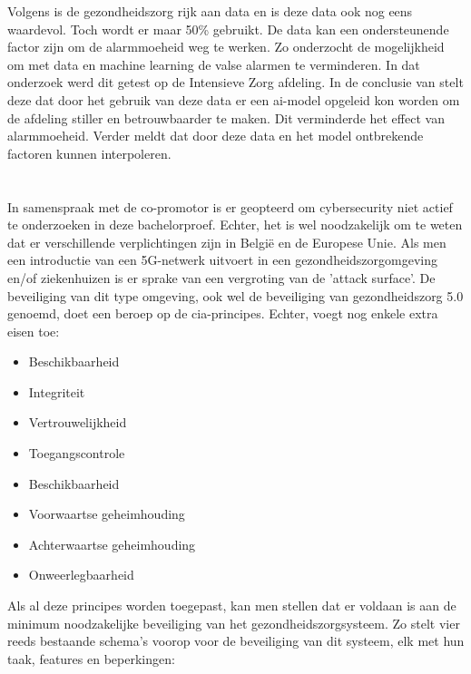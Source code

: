 Volgens \textcite{Niekerk2020} is de gezondheidszorg rijk aan data en is deze data ook nog eens waardevol. Toch wordt er maar 50\% gebruikt.
De data kan een ondersteunende factor zijn om de alarmmoeheid weg te werken. Zo onderzocht \textcite{Hever2019} de mogelijkheid om met data en machine learning de valse alarmen te verminderen. In dat onderzoek werd dit getest op de Intensieve Zorg afdeling. In de conclusie van \textcite{Hever2019} stelt deze dat door het gebruik van deze data er een \gls{ai}-model opgeleid kon worden om de afdeling stiller en betrouwbaarder te maken. Dit verminderde het effect van alarmmoeheid. Verder meldt \textcite{Hever2019} dat door deze data en het model  ontbrekende factoren kunnen interpoleren.

\section{}%
\label{sec:security}%

In samenspraak met de co-promotor is er geopteerd om cybersecurity niet actief te onderzoeken in deze bachelorproef. Echter, het is wel noodzakelijk om te weten dat er verschillende verplichtingen zijn in België en de Europese Unie. Als men een introductie van een 5G-netwerk uitvoert in een gezondheidszorgomgeving en/of ziekenhuizen is er sprake van een vergroting van de 'attack surface'. De beveiliging van dit type omgeving, ook wel de beveiliging van gezondheidszorg 5.0 genoemd, doet een beroep op de \gls{cia}-principes. Echter, \textcite{Wazid2022} voegt nog enkele extra eisen toe:

\begin{itemize}
  \item Beschikbaarheid
  \item Integriteit
  \item Vertrouwelijkheid
  \item Toegangscontrole
  \item Beschikbaarheid
  \item Voorwaartse geheimhouding
  \item Achterwaartse geheimhouding
  \item Onweerlegbaarheid
\end{itemize}

Als al deze principes worden toegepast, kan men stellen dat er voldaan is aan de minimum noodzakelijke beveiliging van het gezondheidszorgsysteem. Zo stelt \textcite{Wazid2022} vier reeds bestaande schema's voorop voor de beveiliging van dit systeem, elk met hun taak, features en beperkingen:

